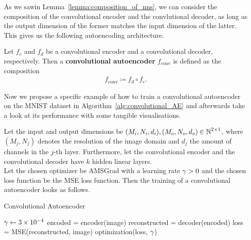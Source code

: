 As we sawin Lemma~\ref{lemma:composition_of_nns}, we can consider the composition of the convolutional encoder and the convlutional decoder, as long as the output dimension of the former matches the input dimension of the latter. This gives us the following autoencoding architecture.

\begin{definition}
Let $f_e$ and $f_d$ be a convolutional encoder and a convolutional decoder, respectively. Then a \textbf{convolutional autoencoder} $f_{\text{conv}}$ is defined as the composition
\begin{align*}
f_{\text{conv}} \coloneqq f_d \circ f_e.
\end{align*}
\end{definition}

Now we propose a specific example of how to train a convolutional autoencoder on the MNIST dataset in Algorithm~\ref{alg:convolutional_AE} and afterwards take a look at its performance with some tangible visualisations.


\begin{algorithm}
Let the input and output dimensions be $(M_i,N_i, d_i), (M_o,N_o,d_o) \in \operatorname{\mathbb{N}}^{2\times 1}$, where $(M_j, N_j)$ denotes the resolution of the image domain and $d_j$ the amount of channels in the $j$-th layer. Furthermore, let the convolutional encoder and the convolutional decoder have $k$ hidden linear layers.\\
Let the chosen optimizer be AMSGrad with a learning rate $\operatorname{\gamma}>0$ and the chosen loss function be the MSE loss function. Then the training of a convolutional autoencoder looks as follows.
\caption{Convolutional Autoencoder}\label{alg:convolutional_AE}
\begin{algorithmic}[1]
\Require $\operatorname{\gamma} \gets \num{3e-4}$		
	    \State encoded = encoder(image) 
		\State reconstructed = decoder(encoded) 
    	\State loss = MSE(reconstructed, image) 
	    \State optimization(loss, $\operatorname{\gamma}$) 
    \EndFor
\EndFor
\end{algorithmic}
\end{algorithm}

